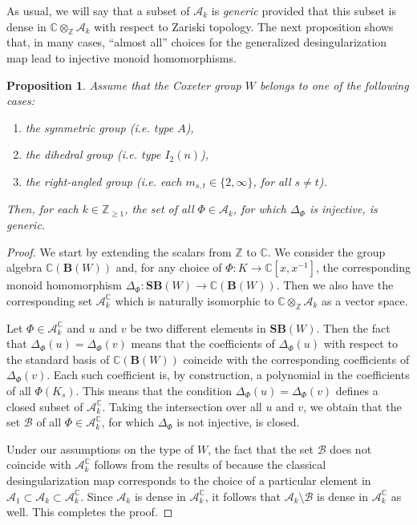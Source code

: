 \documentclass[a4paper]{amsart}
\newtheorem{proposition}[theorem]{Proposition}
\begin{document}
As usual, we will say that a subset of $\mathcal{A}_k$ is {\em generic}
provided that this subset is dense in $\mathbb{C}\otimes_{\mathbb{Z}}\mathcal{A}_k$
with respect to Zariski topology. The next proposition shows that, in many cases,
``almost all'' choices for the generalized desingularization map lead to 
injective monoid homomorphisms.

\begin{proposition}\label{prop3}
Assume that the Coxeter group $W$ belongs to one of the following cases:
\begin{enumerate}[$($a$)$]
\item \label{prop3.1} the symmetric group (i.e. type $A$),
\item \label{prop3.2} the dihedral group (i.e. type $I_2(n)$),
\item \label{prop3.3} the right-angled group (i.e. each $m_{s,t}\in\{2,\infty\}$,
for all $s\neq t$).
\end{enumerate}
Then, for each $k\in\mathbb{Z}_{\geq 1}$, the set of all $\Phi\in\mathcal{A}_k$,
for which $\Delta_\Phi$ is injective, is generic.
\end{proposition}

\begin{proof}
We start by extending the scalars from $\mathbb{Z}$ to $\mathbb{C}$.
We consider the group algebra $\mathbb{C}(\mathbf{B}(W))$ and, for any
choice of $\Phi:K\to \mathbb{C}[x,x^{-1}]$, the corresponding 
monoid homomorphism $\Delta_\Phi:\mathbf{SB}(W)\to \mathbb{C}(\mathbf{B}(W))$.
Then we also have the corresponding set $\mathcal{A}_k^\mathbb{C}$ which is
naturally isomorphic to $\mathbb{C}\otimes_{\mathbb{Z}}\mathcal{A}_k$ as a
vector space.

Let $\Phi\in\mathcal{A}_k^\mathbb{C}$ and $u$ and $v$ be two different
elements in $\mathbf{SB}(W)$. Then the fact that $\Delta_\Phi(u)=\Delta_\Phi(v)$
means that the coefficients of $\Delta_\Phi(u)$ with respect to the standard basis
of $\mathbb{C}(\mathbf{B}(W))$ coincide with the corresponding coefficients
of $\Delta_\Phi(v)$. Each such coefficient is, by construction, a polynomial
in the coefficients of all $\Phi(K_s)$. This means that the condition
$\Delta_\Phi(u)=\Delta_\Phi(v)$ defines a closed subset of $\mathcal{A}_k^\mathbb{C}$.
Taking the intersection over all $u$ and $v$, we obtain that the set $\mathcal{B}$ 
of all $\Phi\in\mathcal{A}_k^\mathbb{C}$, for which $\Delta_\Phi$ is not injective,
is closed. 

Under our assumptions on the type of $W$, the fact that the set $\mathcal{B}$
does not coincide with $\mathcal{A}_k^\mathbb{C}$ follows from
the results of \cite{Pa04,GP05,Ea06} because the classical desingularization map
corresponds to the choice of a particular element in $\mathcal{A}_1\subset\mathcal{A}_k\subset
\mathcal{A}_k^\mathbb{C}$. Since $\mathcal{A}_k$
is dense in $\mathcal{A}_k^\mathbb{C}$, it follows that 
$\mathcal{A}_k\setminus \mathcal{B}$ is dense in $\mathcal{A}_k^\mathbb{C}$
as well. This completes the proof.
\end{proof}
\end{document}
